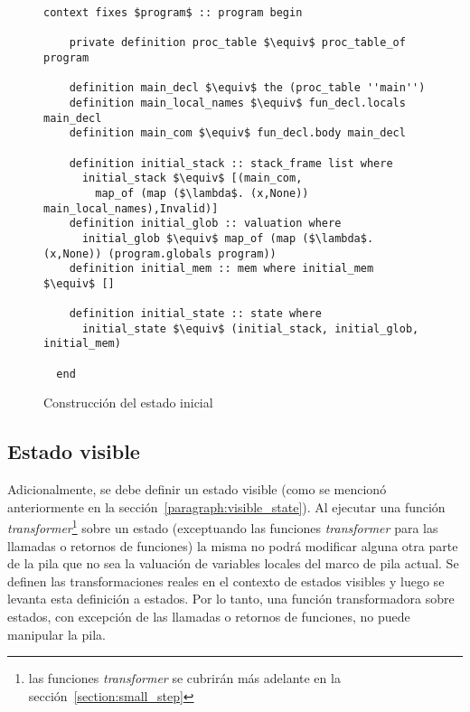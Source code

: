 \begin{figure}
  \begin{lstlisting}[frame=single, mathescape=true]
  context fixes $program$ :: program begin

    private definition proc_table $\equiv$ proc_table_of program

    definition main_decl $\equiv$ the (proc_table ''main'')
    definition main_local_names $\equiv$ fun_decl.locals main_decl
    definition main_com $\equiv$ fun_decl.body main_decl

    definition initial_stack :: stack_frame list where
      initial_stack $\equiv$ [(main_com,
        map_of (map ($\lambda$. (x,None)) main_local_names),Invalid)]
    definition initial_glob :: valuation where
      initial_glob $\equiv$ map_of (map ($\lambda$. (x,None)) (program.globals program))
    definition initial_mem :: mem where initial_mem $\equiv$ []

    definition initial_state :: state where
      initial_state $\equiv$ (initial_stack, initial_glob, initial_mem)

  end
  \end{lstlisting}

  \caption{Construcción del estado inicial}
  \label{fig:init_state_building}
\end{figure}



\subsection{Estado visible}\label{subsection:visible_state}

Adicionalmente, se debe definir un estado visible (como se mencionó anteriormente en la sección~\ref{paragraph:visible_state}).
Al ejecutar una función \textit{transformer}\footnote{las funciones \textit{transformer} se cubrirán más adelante en la sección~\ref{section:small_step}} sobre un estado (exceptuando las funciones \textit{transformer} para las llamadas o retornos de funciones) la misma no podrá modificar alguna otra parte de la pila que no sea la valuación de variables locales del marco de pila actual.
Se definen las transformaciones reales en el contexto de estados visibles y luego se levanta esta definición a estados.
Por lo tanto, una función transformadora sobre estados, con excepción de las llamadas o retornos de funciones, no puede manipular la pila.

